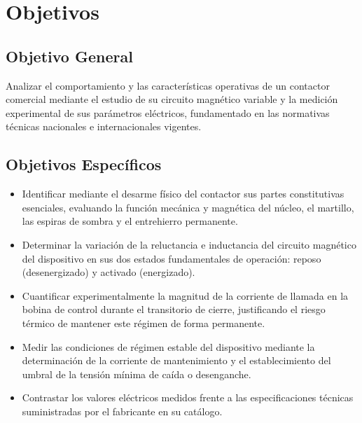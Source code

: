 \section{Objetivos}
\subsection{ Objetivo General}
Analizar el comportamiento y las características operativas de un contactor comercial mediante el estudio de su circuito magnético variable y la medición experimental de sus parámetros eléctricos, fundamentado en las normativas técnicas nacionales e internacionales vigentes.

\subsection{ Objetivos Específicos}
\begin{itemize}
    \item Identificar mediante el desarme físico del contactor sus partes constitutivas esenciales, evaluando la función mecánica y magnética del núcleo, el martillo, las espiras de sombra y el entrehierro permanente.
    \item Determinar la variación de la reluctancia  e inductancia del circuito magnético del dispositivo en sus dos estados fundamentales de operación: reposo (desenergizado) y activado (energizado).
    \item Cuantificar experimentalmente la magnitud de la corriente de llamada en la bobina de control durante el transitorio de cierre, justificando el riesgo térmico de mantener este régimen de forma permanente.
    \item Medir las condiciones de régimen estable del dispositivo mediante la determinación de la corriente de mantenimiento y el establecimiento del umbral de la tensión mínima de caída o desenganche.
    \item Contrastar los valores eléctricos medidos frente a las especificaciones técnicas suministradas por el fabricante en su catálogo.
\end{itemize}